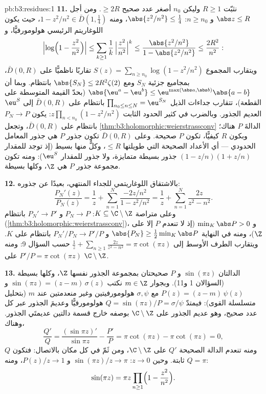 \begin{solution}{pb:b3:residues:1}
\textbf{11.} نثبّت $R \geq 1$ وليكن $n_0$ أصغر عدد صحيح
$\geq 2R$. ومن أجل $\abs z \leq R$ و $n \geq n_0$: $\abs{z^2/n^2} \leq \frac14$،
ومنه $1 - z^2/n^2 \in
\bar D(1, \frac14)$، حيث يكون اللوغاريتم الرئيسي هولومورفيًّا، و
\[
\Bigl|\log\Bigl(1 - \frac{z^2}{n^2}\Bigr)\Bigr|
\leq \sum_{k\geq1}\frac1k\,\Bigl|\frac{z^2}{n^2}\Bigr|^k
\leq \frac{\abs{z^2/n^2}}{1 - \abs{z^2/n^2}}
\leq \frac{2R^2}{n^2} :
\]
ويتقارب المجموع $S(z) = \sum_{n\geq n_0}\log(1 - z^2/n^2)$ تقاربًا ناظميًّا على $\bar D(0, R)$،
بمجاميع جزئية  $S_N$ ومع $\abs{S_N} \leq 2R^2\zeta(2)$ بانتظام. وبما أن
$\abs{\eu^a - \eu^b} \leq
\eu^{\max(\abs a,\abs b)}\abs{a - b}$ (بحدّ القيمة المتوسطة على القطعة)، تتقارب جداءات الذيل
$\prod_{n_0\leq n\leq N} =
\eu^{S_N}$ بانتظام على $\bar D(0, R)$ إلى $\eu^S$ العديم الجذور.
وبالضرب في كثير الحدود الثابت $z\prod_{n<n_0}(1 - z^2/n^2)$: يكون $P_N \to P$ بانتظام
على $\bar D(0, R)$، وتجعل \cref{thm:b3:holomorphic:weierstrassconv} الدالةَ $P$ 
هناك؛ وبكون $R$ كيفيًّا، تكون $P$ صحيحة. وعلى $\bar D(0, R)$
تكون جذور $P$ هي جذور المعامل الحدودي --- أي الأعداد الصحيحة
التي طويلتها $\leq R$، وكلٌّ منها بسيط (إذ توجد للمقدار $(1 - z/n)(1 + z/n)$ جذور بسيطة
متمايزة، ولا جذور للمقدار $\eu^S$): ومنه تكون مجموعة جذور $P$ هي
$\Z$، وكلها بسيطة.

\textbf{12.} بالاشتقاق اللوغاريتمي للجداء المنتهي، بعيدًا عن
جذوره:
\[
\frac{P_N'(z)}{P_N(z)} = \frac1z +
\sum_{n=1}^{N}\frac{-2z/n^2}{1 - z^2/n^2}
= \frac1z + \sum_{n=1}^{N}\frac{2z}{z^2 - n^2} .
\]
وعلى متراصة $K \subseteq \C\setminus\Z$: $P_N \to P$ و $P_N' \to P'$ بانتظام
(\cref{thm:b3:holomorphic:weierstrassconv})، و $\min_K
\abs P > 0$ (إذ لا تنعدم $P$ إلا على $\Z$)، ومنه
في النهاية $\abs{P_N} \geq \frac12\min_K\abs P$ و $P_N'/P_N \to
P'/P$ بانتظام على $K$. ويتقارب الطرف
الأوسط إلى
$\frac1z + \sum_{n\geq1}\frac{2z}{z^2-n^2} = \pi\cot(\pi z)$
حسب السؤال 9: ومنه $P'/P = \pi\cot(\pi z)$ على $\C\setminus\Z$.

\textbf{13.} الدالتان $\sin(\pi z)$ و $P$ صحيحتان بمجموعة
الجذور نفسها $\Z$، وكلها بسيطة (السؤالان 1 و11). وبجوار
$m \in \Z$ نكتب $\sin(\pi z) = (z - m)\,\sigma(z)$ و $P(z) = (z - m)\,\psi(z)$ مع $\sigma, \psi$
هولومورفيتين وغير منعدمتين عند $m$ (بتحليل متسلسلة القوى):
فيمتدّ $Q =
\sin(\pi z)/P = \sigma/\psi$ هولومورفيًّا وعديمَ الجذور عبر كل عدد صحيح،
وهو عديم الجذور على $\C\setminus\Z$ بوصفه خارج قسمة دالتين
عديمتَي الجذور. وهناك،
\[
\frac{Q'}{Q} = \frac{(\sin\pi z)'}{\sin\pi z} -
\frac{P'}{P} = \pi\cot(\pi z) - \pi\cot(\pi z) = 0 ,
\]
ومنه تنعدم الدالة الصحيحة $Q'$ على $\C\setminus\Z$، ومن ثَمّ في
كل مكان بالاتصال: فتكون $Q$ ثابتة. وحين $z \to
0$: $\sin(\pi z)/z \to \pi$
و $P(z)/z \to 1$، ومنه $Q =
\pi$:
\[
\sin(\pi z) = \pi z\prod_{n\geq1}
\Bigl(1 - \frac{z^2}{n^2}\Bigr) .
\]


\end{solution}
